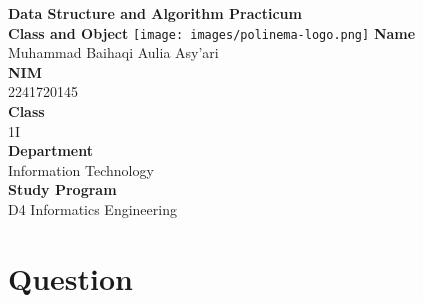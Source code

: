 \documentclass[12pt,titlepage]{article}
\newcommand{\vSubject}{Data Structure and Algorithm Practicum}
\newcommand{\vSubtitle}{Class and Object}
\newcommand{\vName}{Muhammad Baihaqi Aulia Asy'ari}
\newcommand{\vNIM}{2241720145}
\newcommand{\vClass}{1I}
\newcommand{\vDepartment}{Information Technology}
\newcommand{\vStudyProgram}{D4 Informatics Engineering}
\begin{document}
\begin{titlepage}
    \centering
    \vfill
    {\bfseries\LARGE
        \vSubject\\
        \vskip0.25cm
        \vSubtitle
    }
    \vfill
    \texttt{[image: images/polinema-logo.png]}
    \vfill
    {
        \textbf{Name}\\
        \vName\\
        \vskip0.5cm
        \textbf{NIM}\\
        \vNIM\\
        \vskip0.5cm
        \textbf{Class}\\
        \vClass\\
        \vskip0.5cm
        \textbf{Department}\\
        \vDepartment\\
        \vskip0.5cm
        \textbf{Study Program}\\
        \vStudyProgram
    }
\end{titlepage}

\newpage

\setcounter{section}{10}

\section{Question}
\end{document}
